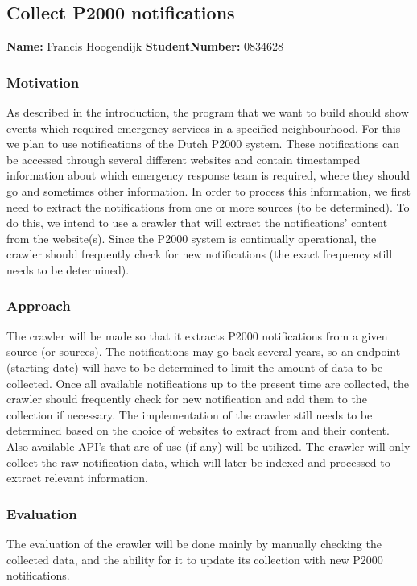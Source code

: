 \subsection*{Collect P2000 notifications}
\textbf{Name:} Francis Hoogendijk \indent \textbf{StudentNumber:} 0834628

\subsubsection*{Motivation}
As described in the introduction, the program that we want to build should show events which required emergency services in a specified neighbourhood. For this we plan to use notifications of the Dutch P2000 system. These notifications can be accessed through several different websites and contain timestamped information about which emergency response team is required, where they should go and sometimes other information. In order to process this information, we first need to extract the notifications from one or more sources (to be determined). To do this, we intend to use a crawler that will extract the notifications' content from the website(s). Since the P2000 system is continually operational, the crawler should frequently check for new notifications (the exact frequency still needs to be determined). 

\subsubsection*{Approach}
The crawler will be made so that it extracts P2000 notifications from a given source (or sources). The notifications may go back several years, so an endpoint (starting date) will have to be determined to limit the amount of data to be collected. Once all available notifications up to the present time are collected, the crawler should frequently check for new notification and add them to the collection if necessary. The implementation of the crawler still needs to be determined based on the choice of websites to extract from and their content. Also available API's that are of use (if any) will be utilized. The crawler will only collect the raw notification data, which will later be indexed and processed to extract relevant information. 

\subsubsection*{Evaluation}
The evaluation of the crawler will be done mainly by manually checking the collected data, and the ability for it to update its collection with new P2000 notifications.